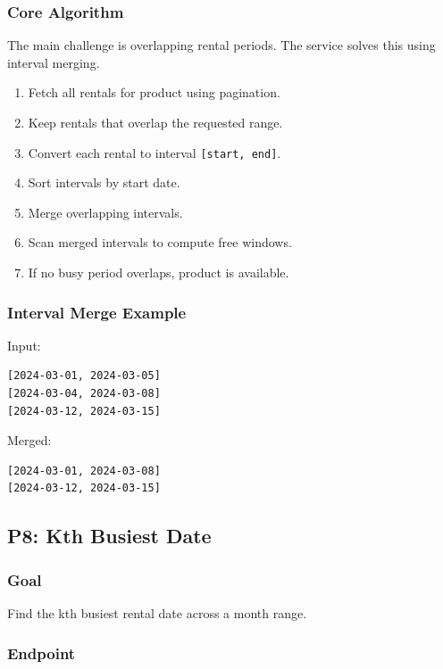 \documentclass[11pt,a4paper]{article}
\begin{document}
\subsubsection*{Core Algorithm}

The main challenge is overlapping rental periods. The service solves this using interval merging.

\begin{enumerate}
  \item Fetch all rentals for product using pagination.
  \item Keep rentals that overlap the requested range.
  \item Convert each rental to interval \texttt{[start, end]}.
  \item Sort intervals by start date.
  \item Merge overlapping intervals.
  \item Scan merged intervals to compute free windows.
  \item If no busy period overlaps, product is available.
\end{enumerate}

\subsubsection*{Interval Merge Example}

Input:

\begin{lstlisting}
[2024-03-01, 2024-03-05]
[2024-03-04, 2024-03-08]
[2024-03-12, 2024-03-15]
\end{lstlisting}

Merged:

\begin{lstlisting}
[2024-03-01, 2024-03-08]
[2024-03-12, 2024-03-15]
\end{lstlisting}

\subsection{P8: Kth Busiest Date}

\subsubsection*{Goal}
Find the kth busiest rental date across a month range.

\subsubsection*{Endpoint}
\end{document}

